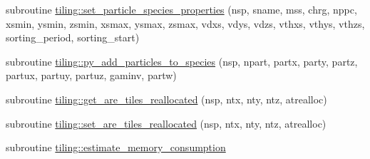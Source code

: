 \begin{DoxyCompactItemize}
\item 
subroutine \hyperlink{namespacetiling_a832a380c64af7fb0611b3528b1b28ef2}{tiling\+::set\+\_\+particle\+\_\+species\+\_\+properties} (nsp, sname, mss, chrg, nppc, xsmin, ysmin, zsmin, xsmax, ysmax, zsmax, vdxs, vdys, vdzs, vthxs, vthys, vthzs, sorting\+\_\+period, sorting\+\_\+start)
\item 
subroutine \hyperlink{namespacetiling_a7d2954e264909ff996bff6096932a53d}{tiling\+::py\+\_\+add\+\_\+particles\+\_\+to\+\_\+species} (nsp, npart, partx, party, partz,                                                       partux, partuy, partuz, gaminv, partw)
\item 
subroutine \hyperlink{namespacetiling_a74f93e807809bce73965e51431a8f8c7}{tiling\+::get\+\_\+are\+\_\+tiles\+\_\+reallocated} (nsp, ntx, nty, ntz, atrealloc)
\item 
subroutine \hyperlink{namespacetiling_a9ac073551919a3ca368f58e56b9370e6}{tiling\+::set\+\_\+are\+\_\+tiles\+\_\+reallocated} (nsp, ntx, nty, ntz, atrealloc)
\item 
subroutine \hyperlink{namespacetiling_a535146a13d8c0743eba14d150ca49199}{tiling\+::estimate\+\_\+memory\+\_\+consumption}
\end{DoxyCompactItemize}
